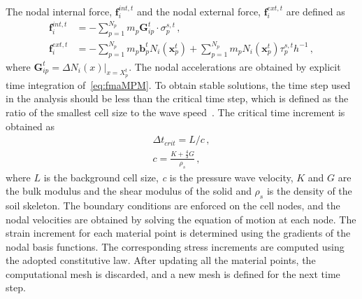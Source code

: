 %
The nodal internal force, $\mathbf{f}_{\mathit{i}}^{int,\mathit{t}}$ and the 
nodal external force, $\mathbf{f}_{\mathit{i}}^{ext,\mathit{t}}$ are defined as
%
\begin{align}
\nonumber
 \mathbf{f}_{\mathit{i}}^{int,\mathit{t}} & = - 
\sum\limits_{\mathit{p}=1}^{\mathit{N}_{p}}\mathit{m}_{p} \mathbf{G}_{ip}^{t} 
\cdot \sigma_{p}^{\mathit{s,t}} \,, \\ 
\mathbf{f}_{\mathit{i}}^{ext,\mathit{t}} & = - 
\sum\limits_{\mathit{p}=1}^{\mathit{N}_{p}}\mathit{m}_{p}  
\mathbf{b}_{p}^{\mathit{t}}\mathit{N}_{\mathit{i}}(\mathbf{x}_{p}^{\mathit{t}}) 
+ \sum\limits_{\mathit{p}=1}^{\mathit{N}_{p}}\mathit{m}_{p} 
\mathit{N}_{\mathit{i}}(\mathbf{x}_{p}^{\mathit{t}}) 
\tau_{p}^{\mathit{s,t}}\mathit{h}^{-1} \,,
\end{align}
where $\mathbf{G}_{\mathit{ip}}^{\mathit{t}} = \Delta \mathit{N}_{\mathit{i}} 
(\mathbf{\mathit{x}})|_{\mathbf{\mathit{x}}=\mathbf{\mathit{X}}_{p}^{\mathit{t}}}$.
The nodal accelerations are obtained by explicit time integration 
of~\cref{eq:fmaMPM}. To obtain stable solutions, the time step used in the 
analysis should be less than the critical time step, which is defined as the 
ratio of the smallest cell size to the wave speed~\citep{Chen2002}. The 
critical time increment is obtained as
%
\begin{align}
\Delta t_{crit} = L / c \,, \\
c = \frac{K+\frac{4}{3}G}{\rho_s} \,,
\end{align}
where $L$ is the background cell size, \textit{c} is the pressure wave 
velocity, $K$ and $G$ are the bulk modulus and the shear modulus of the solid 
and $\rho_s$ is the density of the soil skeleton. The boundary conditions are 
enforced on the cell nodes, and the nodal velocities are obtained by solving 
the equation of motion at each node. The strain increment for each material 
point is determined using the gradients of the nodal basis functions. The 
corresponding stress increments are computed using the adopted constitutive 
law. After updating all the material points, the computational mesh is 
discarded, and a new mesh is defined for the next time step. 

